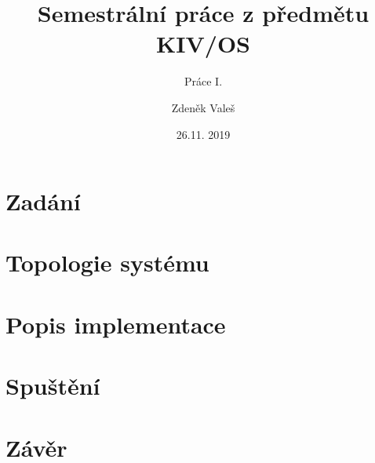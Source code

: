 \documentclass[11pt,a4paper]{scrartcl}
\begin{document}
	\title{Semestrální práce z předmětu KIV/OS}
	\subtitle{Práce I.}
	\author{Zdeněk Valeš}
	\date{26.11. 2019}
	\maketitle
	\newpage
	
	\section{Zadání}
	
	\section{Topologie systému}
	
	\section{Popis implementace}
	
	\section{Spuštění}
	
	\section{Závěr}
	
\end{document}
